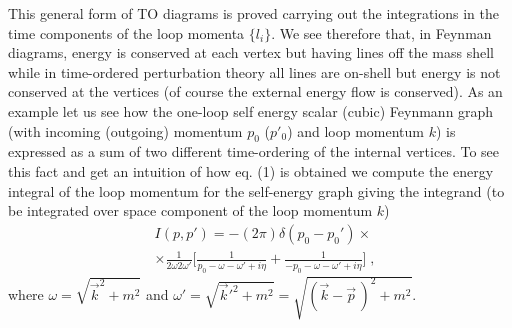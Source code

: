 \documentclass[%
 reprint,
 amsmath,amssymb,
 aps,
]{revtex4-1}
\begin{document}
This general form of TO diagrams is proved carrying out the integrations in the time components of the loop momenta $\{l_i\}$. We see therefore that, in Feynman diagrams, energy is conserved at each vertex but having lines off the mass shell while in time-ordered perturbation theory all lines are on-shell but energy is not conserved at the vertices (of course the external energy flow is conserved). As an example let us see how the one-loop self energy scalar (cubic) Feynmann graph (with incoming (outgoing) momentum $p_0$ ($p'_0$) and loop momentum $k$) is expressed as a sum of two different time-ordering of the internal vertices. To see this fact and get an intuition of how eq. (1) is obtained we compute the energy integral of the loop momentum for the self-energy graph giving the integrand (to be integrated over space component of the loop momentum $k$)
\begin{align}
&I(p,p')=-(2\pi)\delta(p_0-p_0')\times\nonumber\\
&\times\frac{1}{2\omega2\omega'}\Big[\frac{1}{p_0-\omega-\omega'+i\eta}+\frac{1}{-p_0-\omega-\omega'+i\eta}\Big]\;,\label{fetonia}
\end{align}
where $\omega=\sqrt{\vec{k}^2+m^2}$ and $\omega'=\sqrt{\vec{k}'^2+m^2}=\sqrt{(\vec{k}-\vec{p}\,)^2+m^2}$.\par
\end{document}
